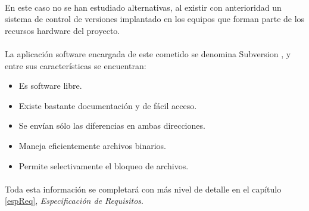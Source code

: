    \paragraph{}En este caso no se han estudiado alternativas, al existir con
   anterioridad un sistema de control de versiones implantado en los equipos
   que forman parte de los recursos hardware del proyecto.

   \paragraph{}La aplicación software encargada de este cometido se denomina
   Subversion \cite{subversion}, y entre sus características se encuentran:
   \begin{itemize}
      \item Es software libre.
      \item Existe bastante documentación y de fácil acceso.
      \item Se envían sólo las diferencias en ambas direcciones.
      \item Maneja eficientemente archivos binarios.
      \item Permite selectivamente el bloqueo de archivos.
   \end{itemize}

\paragraph{}Toda esta información se completará con más nivel de detalle en el
capítulo \ref{espReq}, \textit{Especificación de Requisitos}.
